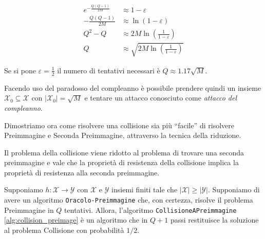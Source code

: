 \begin{align*}
    e^{-\frac{Q(Q-1)}{2M}} &\approx 1 - \varepsilon\\
    -\frac{Q(Q-1)}{2M} &\approx \ln(1-\varepsilon)\\
    Q^2 - Q &\approx 2M \ln\left(\frac{1}{1-\varepsilon}\right)\\
    Q &\approx \sqrt{2M \ln\left(\frac{1}{1-\varepsilon}\right)}
\end{align*}

\noindent Se si pone $\varepsilon = \frac{1}{2}$ il numero di tentativi necessari è $Q \approx 1.17\sqrt{M}$.

\vspace{0.2cm} \noindent Facendo uso del paradosso del compleanno è possibile prendere quindi un insieme $\mathcal{X}_0 \subseteq \mathcal{X}$ con $|\mathcal{X}_0| = \sqrt{M}$ e tentare un attacco conosciuto come \emph{attacco del compleanno}.


\vspace{0.5cm} \noindent Dimostriamo ora come risolvere una collisione sia più ``facile'' di risolvere Preimmagine e Seconda Preimmagine, attraverso la tecnica della riduzione. 



\noindent Il problema della collisione viene ridotto al problema di trovare una seconda preimmagine e vale che la proprietà di resistenza della collisione implica la proprietà di resistenza alla seconda preimmagine. 



\vspace{2em}
\begin{theorem} Supponiamo $h:\mathcal{X} \to \mathcal{Y}$ con $\mathcal{X}$ e $\mathcal{Y}$ insiemi finiti tale che $|\mathcal{X}|\geq |\mathcal{Y}|$. Supponiamo di avere un algoritmo \texttt{Oracolo-Preimmagine} che, con certezza, risolve il problema Preimmagine in $Q$ tentativi. Allora, l'algoritmo \texttt{CollisioneAPreimmagine} \ref{alg:collision_preimage} è un algoritmo che in $Q+1$ passi restituisce la soluzione al problema Collisione con probabilità $1/2$. 
\end{theorem}


